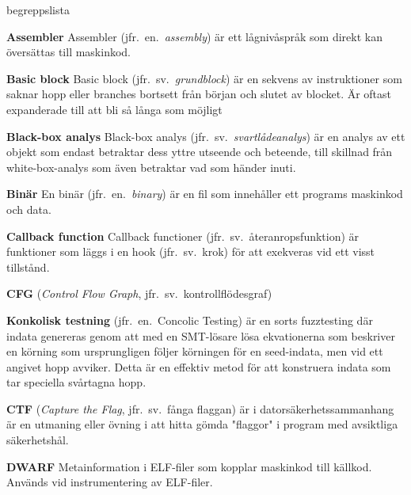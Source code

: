 \begin{labeling}{begreppslista}

    \item [\textbf{Assembler}] Assembler (jfr.\ en.\ \emph{assembly}) är ett
    lågnivåspråk som direkt kan översättas till maskinkod.

    \item[\textbf{Basic block}] Basic block (jfr.\ sv.\ \emph{grundblock}) är en
    sekvens av instruktioner som saknar hopp eller branches bortsett från
    början och slutet av blocket. Är oftast expanderade till att bli så långa
    som möjligt

    \item [\textbf{Black-box analys}] Black-box analys (jfr.\ sv.\
    \emph{svartlådeanalys}) är en analys av ett objekt som endast betraktar dess
    yttre utseende och beteende, till skillnad från white-box-analys som även
    betraktar vad som händer inuti.

    \item [\textbf{Binär}] En binär (jfr.\ en.\ \emph{binary}) är en fil som
    innehåller ett programs maskinkod och data.

    \item [\textbf{Callback function}] Callback functioner (jfr.\ sv.\
    återanropsfunktion) är funktioner som läggs i en hook (jfr.\ sv.\ krok) för
    att exekveras vid ett visst tillstånd.

    \item [\textbf{CFG}] (\emph{Control Flow Graph},
          jfr.\ sv.\ kontrollflödesgraf)

    \item [\textbf{Konkolisk testning}] (jfr.\ en.\ Concolic Testing)
    är en sorts fuzztesting där indata genereras genom att med en
    SMT-lösare lösa ekvationerna som beskriver en körning som
    ursprungligen följer körningen för en seed-indata, men vid ett
    angivet hopp avviker. Detta är en effektiv metod för att
    konstruera indata som tar speciella svårtagna hopp.

    \item [\textbf{CTF}] (\emph{Capture the Flag}, jfr.\ sv.\ fånga
          flaggan) är i datorsäkerhetssammanhang är en utmaning eller
    övning i att hitta gömda "flaggor" i program med avsiktliga
    säkerhetshål.

    \item [\textbf{DWARF}] Metainformation i ELF-filer som kopplar
    maskinkod till källkod. Används vid instrumentering av
    ELF-filer.


\end{labeling}
